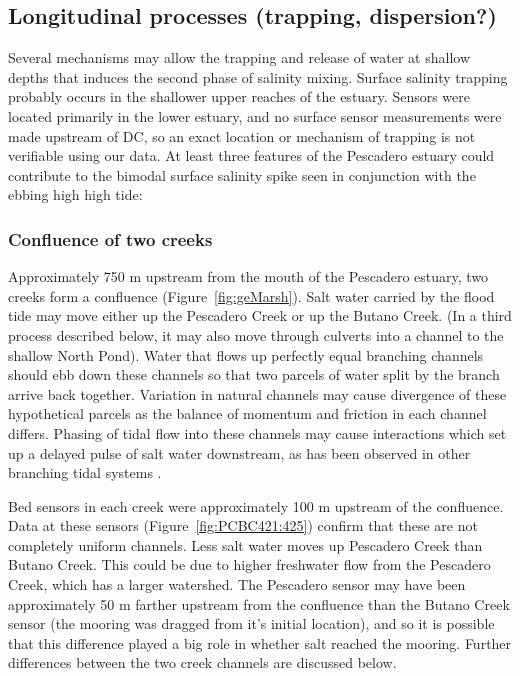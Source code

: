 \subsection{Longitudinal processes (trapping, dispersion?)}

Several mechanisms may allow the trapping and release of water at shallow depths that induces the second phase of salinity mixing. Surface salinity trapping probably occurs in the shallower upper reaches of the estuary. Sensors were located primarily in the lower estuary, and no surface sensor measurements were made upstream of DC, so an exact location or mechanism of trapping is not verifiable using our data. At least three features of the Pescadero estuary could contribute to the bimodal surface salinity spike seen in conjunction with the ebbing high high tide:

\subsubsection{Confluence of two creeks}
Approximately 750 m upstream from the mouth of the Pescadero estuary, two creeks form a confluence (Figure~\ref{fig:geMarsh}). Salt water carried by the flood tide may move either up the Pescadero Creek or up the Butano Creek. (In a third process described below, it may also move through culverts into a channel to the shallow North Pond). Water that flows up perfectly equal branching channels should ebb down these channels so that two parcels of water split by the branch arrive back together. Variation in natural channels may cause divergence of these hypothetical parcels as the balance of momentum and friction in each channel differs. Phasing of tidal flow into these channels may cause interactions which set up a delayed pulse of salt water downstream, as has been observed in other branching tidal systems \parencite{macvean_estuarine_2011}.

Bed sensors in each creek were approximately 100 m upstream of the confluence. Data at these sensors (Figure~\ref{fig:PCBC421:425}) confirm that these are not completely uniform channels. Less salt water moves up Pescadero Creek than Butano Creek. This could be due to higher freshwater flow from the Pescadero Creek, which has a larger watershed. The Pescadero sensor may have been approximately 50 m farther upstream from the confluence than the Butano Creek sensor (the mooring was dragged from it's initial location), and so it is possible that this difference played a big role in whether salt reached the mooring. Further differences between the two creek channels are discussed below.

